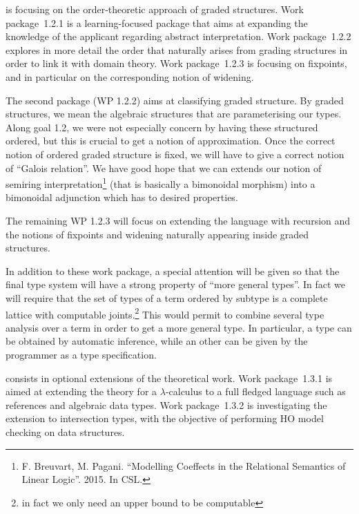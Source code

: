 \documentclass{article}[11pt]
\begin{document}
 is focusing on the order-theoretic approach of graded structures. Work package~1.2.1 is a learning-focused package that aims at expanding the knowledge of the applicant regarding abstract interpretation. %
Work package~1.2.2 explores in more detail the order that naturally arises from grading structures in order to link it with domain theory. Work package~1.2.3 is focusing on fixpoints, and in particular on the corresponding notion of widening.


The second package (WP 1.2.2) aims at classifying graded structure. By graded structures, we mean the algebraic structures that are parameterising our types. Along goal 1.2, we were not especially concern by having these structured ordered, but this is crucial to get a notion of approximation. Once the correct notion of ordered graded structure is fixed, we will have to give a correct notion of ``Galois relation''. We have good hope that we can extends our notion of semiring interpretation\footnote{F. Breuvart, M. Pagani. ``Modelling Coeffects in the Relational Semantics of Linear Logic''. 2015. In CSL.} (that is basically a bimonoidal morphism) into a bimonoidal adjunction which has to desired properties.

The remaining WP 1.2.3 will focus on extending the language with recursion and the notions of fixpoints and widening naturally appearing inside graded structures.

In addition to these work package, a special attention will be given so that the final type system will have a strong property of ``more general types''. In fact we will require that the set of types of a term ordered by subtype is a complete lattice with computable joints.\footnote{in fact we only need an upper bound to be computable} This would permit to combine several type analysis over a term in order to get a more general type. In particular, a type can be obtained by automatic inference, while an other can be given by the programmer as a type specification.

 consists in optional extensions of the theoretical work. Work package~1.3.1 is aimed at extending the theory for a $\lambda$-calculus to a full fledged language such as references and algebraic data types. Work package~1.3.2 is investigating the extension to intersection types, with the objective of performing HO model checking on data structures.
\end{document}
